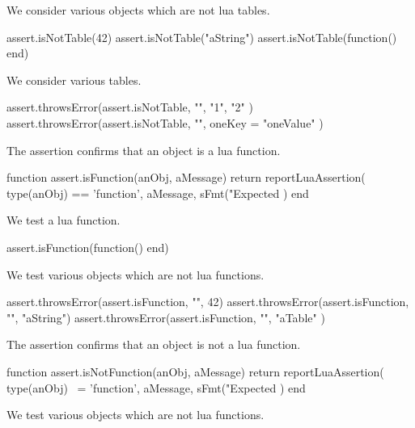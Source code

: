 
We consider various objects which are not lua tables.

\startLuaTest
  assert.isNotTable(42)
  assert.isNotTable("aString")
  assert.isNotTable(function() end)
\stopLuaTest
\stopTestCase


We consider various tables.

\startLuaTest
  assert.throwsError(assert.isNotTable, "", { "1", "2" })
  assert.throwsError(assert.isNotTable, "", { oneKey = "oneValue" })
\stopLuaTest
\stopTestCase

\stopTestSuite


The  assertion confirms that an object is a lua 
function. 

\startLuaCode
function assert.isFunction(anObj, aMessage)
  return reportLuaAssertion(
    type(anObj) == 'function',
    aMessage,
    sFmt("Expected %
  )
end
\stopLuaCode


We test a lua function.

\startLuaTest
  assert.isFunction(function() end)
\stopLuaTest
\stopTestCase


We test various objects which are not lua functions.

\startLuaTest
  assert.throwsError(assert.isFunction, "", 42)
  assert.throwsError(assert.isFunction, "", "aString")
  assert.throwsError(assert.isFunction, "", { "aTable" })
\stopLuaTest
\stopTestCase

\stopTestSuite


The  assertion confirms that an object is not a 
lua function. 

\startLuaCode
function assert.isNotFunction(anObj, aMessage)
  return reportLuaAssertion(
    type(anObj) ~= 'function',
    aMessage,
    sFmt("Expected %
  )
end
\stopLuaCode


We test various objects which are not lua functions.

